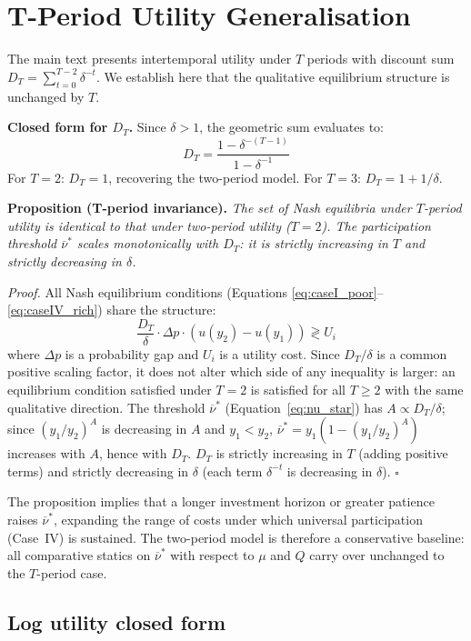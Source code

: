 \documentclass[
    oneside,
    fontsize=10pt,leqno]{article}
\begin{document}
\newpage
\section{T-Period Utility Generalisation}\label{sec:appendix_Tperiod}

The main text presents intertemporal utility under $T$ periods with
discount sum $D_{T}=\sum_{t=0}^{T-2}\delta^{-t}$. We establish
here that the qualitative equilibrium structure is unchanged by $T$.

\medskip
\noindent\textbf{Closed form for $D_{T}$.} Since $\delta>1$, the
geometric sum evaluates to:
\[
D_{T}=\frac{1-\delta^{-(T-1)}}{1-\delta^{-1}}
\]
For $T=2$: $D_{T}=1$, recovering the two-period model. For $T=3$:
$D_{T}=1+1/\delta$.

\medskip
\noindent\textbf{Proposition (T-period invariance).} \textit{The
set of Nash equilibria under $T$-period utility is identical to
that under two-period utility ($T=2$). The participation threshold
$\overline{\nu}^{*}$ scales monotonically with $D_{T}$: it is
strictly increasing in $T$ and strictly decreasing in $\delta$.}

\medskip
\noindent\textit{Proof.} All Nash equilibrium conditions (Equations
\ref{eq:caseI_poor}--\ref{eq:caseIV_rich}) share the structure:
\[
\frac{D_{T}}{\delta}\cdot\Delta p\cdot(u(y_{2})-u(y_{1}))\gtrless U_{i}
\]
where $\Delta p$ is a probability gap and $U_{i}$ is a utility
cost. Since $D_{T}/\delta$ is a common positive scaling factor,
it does not alter which side of any inequality is larger: an equilibrium
condition satisfied under $T=2$ is satisfied for all $T\geq2$ with
the same qualitative direction. The threshold $\overline{\nu}^{*}$
(Equation~\ref{eq:nu_star}) has $A\propto D_{T}/\delta$; since
$(y_{1}/y_{2})^{A}$ is decreasing in $A$ and $y_{1}<y_{2}$,
$\overline{\nu}^{*}=y_{1}(1-(y_{1}/y_{2})^{A})$ increases with
$A$, hence with $D_{T}$. $D_{T}$ is strictly increasing in $T$
(adding positive terms) and strictly decreasing in $\delta$ (each
term $\delta^{-t}$ is decreasing in $\delta$). $\square$

\medskip
The proposition implies that a longer investment horizon or greater
patience raises $\overline{\nu}^{*}$, expanding the range of costs
under which universal participation (Case~IV) is sustained. The
two-period model is therefore a conservative baseline: all comparative
statics on $\overline{\nu}^{*}$ with respect to $\mu$ and $Q$
carry over unchanged to the $T$-period case.


\subsection*{Log utility closed form}
\end{document}
